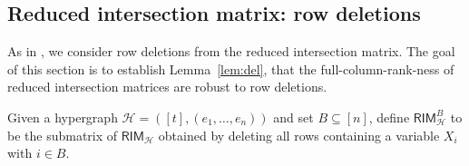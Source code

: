 \documentclass{article}[11pt]
\begin{document}
\subsection{Reduced intersection matrix: row deletions}

As in \cite{GZ23}, we consider row deletions from the reduced intersection matrix. 
The goal of this section is to establish Lemma~\ref{lem:del}, that the full-column-rank-ness of reduced intersection matrices are robust to row deletions.

\begin{definition}
  Given a hypergraph $\mathcal{H}=([t],(e_1,\dots,e_n))$ and set $B \subseteq [n]$, define $\mathsf{RIM}_{\mathcal{H}}^B$ to be the submatrix of $\mathsf{RIM}_\mathcal{H}$ obtained by deleting all rows containing a variable $X_i$ with $i\in B$.
  \label{def:del}
\end{definition}
\end{document}
